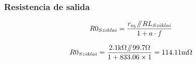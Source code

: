 \subsubsection{Resistencia de salida}

\begin{equation}
R{0_{Sziklai}} = \frac{ r_{o_{5}} \parallelresistors R{L_{Sziklai}}  }{1 + a \cdot f}
\end{equation}

\begin{equation*}
R{0_{Sziklai}} = \frac{ 2.1 \si[per-mode=symbol]{\kilo\ohm} \parallelresistors 99.7 \si[per-mode=symbol]{\ohm}  }{  1 + 833.06 \times 1 } = 114.11 \si[per-mode=symbol]{\milli\ohm}
\end{equation*}








